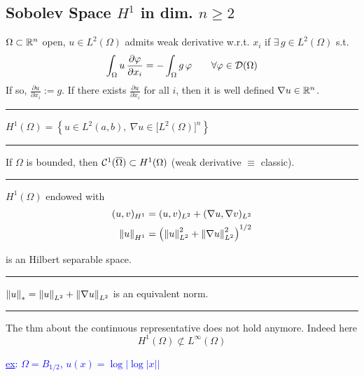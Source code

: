 
\subsection{\color{red}Sobolev Space \texorpdfstring{$H^1$}{C} in dim. \texorpdfstring{$n\geq 2$}{C}}


$\Omega\subset \mathbb{R}^n$ open, $u\in L^2(\Omega)$ admits weak derivative w.r.t. $x_i$ if $\exists\,g\in L^2(\Omega)$ s.t.
\begin{equation*}
\int_\Omega u\,\frac{\partial\varphi}{\partial x_i}=-\int_\Omega g\,\varphi\qquad\forall \varphi\in \mathcal{D}(\Omega)
\end{equation*}
If so, $\frac{\partial u}{\partial x_i} :=g$. If there exists $\frac{\partial u}{\partial x_i}$ for all $i$, then it is well defined $\nabla u\in\mathbb{R}^n$. 

\rule{0.31\textwidth}{0.2pt}
\smallskip

$H^1(\Omega) = \left\{ u\in L^2(a,b),\ \nabla u\in\big[ L^2(\Omega) \big]^n \right\}$

\rule{0.31\textwidth}{0.2pt}
\smallskip

If $\Omega$ is bounded, then $\mathcal{C}^1(\overline{\Omega})\subset H^1(\Omega)$ (weak derivative $\equiv$ classic).

\rule{0.31\textwidth}{0.2pt}
\smallskip

$H^1(\Omega)$ endowed with
\begin{align*}
(u,v)_{H^1}&=(u,v)_{L^2}+(\nabla u,\nabla v)_{L^2} \\
\left\lVert u \right\rVert_{H^1}&=\left( \left\lVert u \right\rVert^2_{L^2}+\left\lVert \nabla u \right\rVert^2_{L^2} \right)^{1/2}
\end{align*}

is an Hilbert separable space.

\rule{0.31\textwidth}{0.2pt}
\smallskip

$\left\lVert u \right\rVert_{*}=\left\lVert u \right\rVert_{L^2}+\left\lVert \nabla u \right\rVert
_{L^2}$ is an equivalent norm.

\rule{0.31\textwidth}{0.2pt}
\smallskip

The thm about the continuous representative does not hold anymore. Indeed here
\begin{equation*}
H^1(\Omega)\not\subset L^\infty(\Omega)
\end{equation*}

\textcolor{blue}{\underline{ex}: $\Omega=B_{1/2}$, $u(x)=\log\left| \log \left| x \right| \right|$ }

